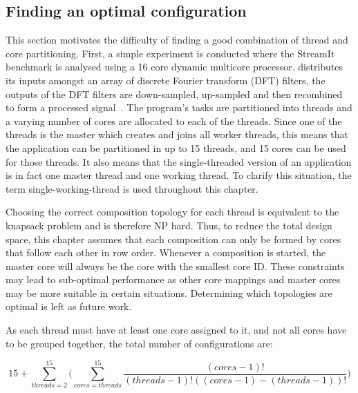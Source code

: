 \subsection{Finding an optimal configuration}
This section motivates the difficulty of finding a good combination of thread and core partitioning.
First, a simple experiment is conducted where the  StreamIt benchmark is analysed using a 16 core dynamic multicore processor.
 distributes its inputs amongst an array of discrete Fourier transform (DFT) filters, the outputs of the DFT filters are down-sampled, up-sampled and then recombined to form a processed signal~\cite{streamitrepo}.
The program's tasks are partitioned into threads and a varying number of cores are allocated to each of the threads.
Since one of the threads is the master which creates and joins all worker threads, this means that the application can be partitioned in up to 15 threads, and 15 cores can be used for those threads.
It also means that the single-threaded version of an application is in fact one master thread and one working thread.
To clarify this situation, the term single-working-thread is used throughout this chapter.

Choosing the correct composition topology for each thread is equivalent to the knapsack problem and is therefore NP hard.
Thus, to reduce the total design space, this chapter assumes that each composition can only be formed by cores that follow each other in row order.
Whenever a composition is started, the master core will always be the core with the smallest core ID.
These constraints may lead to sub-optimal performance as other core mappings and master cores may be more suitable in certain situations.
Determining which topologies are optimal is left as future work.

As each thread must have at least one core assigned to it, and not all cores have to be grouped together, the total number of configurations are:

\begin{equation}
15 + \sum_{threads=2}^{15} \bigg( \sum_{cores=threads}^{15} \frac{(cores-1)!}{(threads-1)!((cores-1)-(threads-1))!}\bigg)
\label{eq:comb}
\end{equation}

